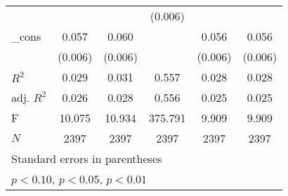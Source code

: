{\begin{tabular}{l*{5}{c}}
            &                     &                     &     (0.006)         &                     &                     \\
\_cons      &       0.057\sym{***}&       0.060\sym{***}&                     &       0.056\sym{***}&       0.056\sym{***}\\
            &     (0.006)         &     (0.006)         &                     &     (0.006)         &     (0.006)         \\
\hline
\(R^{2}\)   &       0.029         &       0.031         &       0.557         &       0.028         &       0.028         \\
adj. \(R^{2}\)&       0.026         &       0.028         &       0.556         &       0.025         &       0.025         \\
F           &      10.075         &      10.934         &     375.791         &       9.909         &       9.909         \\
\(N\)       &        2397         &        2397         &        2397         &        2397         &        2397         \\
\hline\hline
\multicolumn{6}{l}{\footnotesize Standard errors in parentheses}\\
\multicolumn{6}{l}{\footnotesize \sym{*} \(p<0.10\), \sym{**} \(p<0.05\), \sym{***} \(p<0.01\)}\\
\end{tabular}
}
